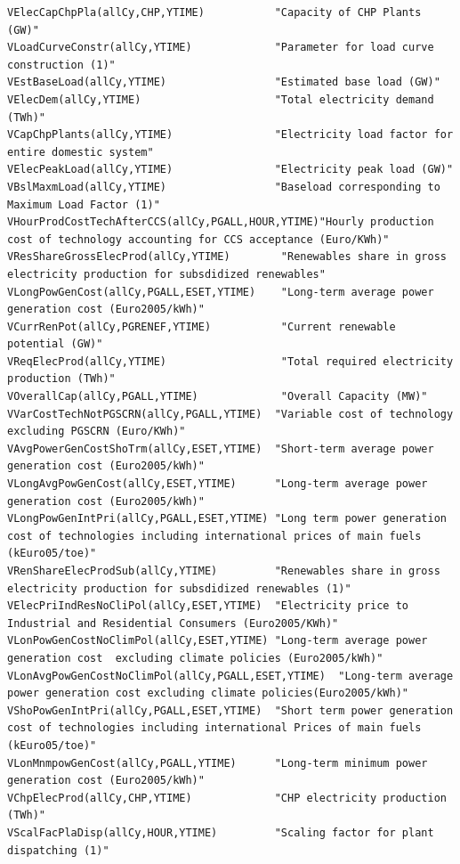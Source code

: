 \documentclass[a4paper,]{scrartcl}
\begin{document}
\begin{lstlisting}
VElecCapChpPla(allCy,CHP,YTIME)           "Capacity of CHP Plants (GW)"
VLoadCurveConstr(allCy,YTIME)             "Parameter for load curve construction (1)"
VEstBaseLoad(allCy,YTIME)                 "Estimated base load (GW)"    
VElecDem(allCy,YTIME)                     "Total electricity demand (TWh)"
VCapChpPlants(allCy,YTIME)                "Electricity load factor for entire domestic system"  
VElecPeakLoad(allCy,YTIME)                "Electricity peak load (GW)"  
VBslMaxmLoad(allCy,YTIME)                 "Baseload corresponding to Maximum Load Factor (1)"
VHourProdCostTechAfterCCS(allCy,PGALL,HOUR,YTIME)"Hourly production cost of technology accounting for CCS acceptance (Euro/KWh)"
VResShareGrossElecProd(allCy,YTIME)        "Renewables share in gross electricity production for subsdidized renewables"
VLongPowGenCost(allCy,PGALL,ESET,YTIME)    "Long-term average power generation cost (Euro2005/kWh)"
VCurrRenPot(allCy,PGRENEF,YTIME)           "Current renewable potential (GW)"           
VReqElecProd(allCy,YTIME)                  "Total required electricity production (TWh)"    
VOverallCap(allCy,PGALL,YTIME)             "Overall Capacity (MW)"  
VVarCostTechNotPGSCRN(allCy,PGALL,YTIME)  "Variable cost of technology excluding PGSCRN (Euro/KWh)"
VAvgPowerGenCostShoTrm(allCy,ESET,YTIME)  "Short-term average power generation cost (Euro2005/kWh)" 
VLongAvgPowGenCost(allCy,ESET,YTIME)      "Long-term average power generation cost (Euro2005/kWh)"  
VLongPowGenIntPri(allCy,PGALL,ESET,YTIME) "Long term power generation cost of technologies including international prices of main fuels (kEuro05/toe)"
VRenShareElecProdSub(allCy,YTIME)         "Renewables share in gross electricity production for subsdidized renewables (1)"  
VElecPriIndResNoCliPol(allCy,ESET,YTIME)  "Electricity price to Industrial and Residential Consumers (Euro2005/KWh)"    
VLonPowGenCostNoClimPol(allCy,ESET,YTIME) "Long-term average power generation cost  excluding climate policies (Euro2005/kWh)"  
VLonAvgPowGenCostNoClimPol(allCy,PGALL,ESET,YTIME)  "Long-term average power generation cost excluding climate policies(Euro2005/kWh)"  
VShoPowGenIntPri(allCy,PGALL,ESET,YTIME)  "Short term power generation cost of technologies including international Prices of main fuels (kEuro05/toe)"     
VLonMnmpowGenCost(allCy,PGALL,YTIME)      "Long-term minimum power generation cost (Euro2005/kWh)"  
VChpElecProd(allCy,CHP,YTIME)             "CHP electricity production (TWh)"    
VScalFacPlaDisp(allCy,HOUR,YTIME)         "Scaling factor for plant dispatching (1)"

\end{lstlisting}
\end{document}
